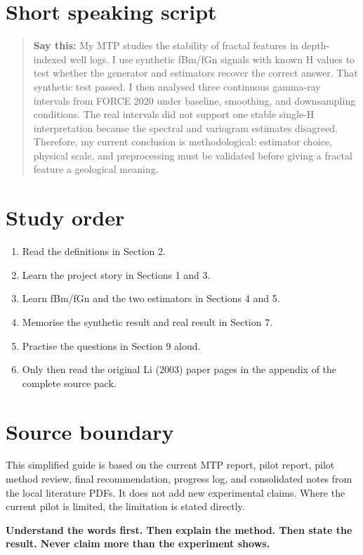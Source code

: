 \documentclass[11pt,a4paper]{article}
\newcommand{\say}[1]{\begin{quote}\color{Navy}\textbf{Say this:} #1\end{quote}}
\begin{document}
\section{Short speaking script}
\say{My MTP studies the stability of fractal features in depth-indexed well logs. I use synthetic fBm/fGn signals with known H values to test whether the generator and estimators recover the correct answer. That synthetic test passed. I then analysed three continuous gamma-ray intervals from FORCE 2020 under baseline, smoothing, and downsampling conditions. The real intervals did not support one stable single-H interpretation because the spectral and variogram estimates disagreed. Therefore, my current conclusion is methodological: estimator choice, physical scale, and preprocessing must be validated before giving a fractal feature a geological meaning.}

\section{Study order}
\begin{enumerate}
\item Read the definitions in Section 2.
\item Learn the project story in Sections 1 and 3.
\item Learn fBm/fGn and the two estimators in Sections 4 and 5.
\item Memorise the synthetic result and real result in Section 7.
\item Practise the questions in Section 9 aloud.
\item Only then read the original Li (2003) paper pages in the appendix of the complete source pack.
\end{enumerate}

\section{Source boundary}
This simplified guide is based on the current MTP report, pilot report, pilot method review, final recommendation, progress log, and consolidated notes from the local literature PDFs. It does not add new experimental claims. Where the current pilot is limited, the limitation is stated directly.

\vfill
\begin{center}
\color{Teal}\textbf{Understand the words first. Then explain the method. Then state the result. Never claim more than the experiment shows.}
\end{center}
\end{document}

